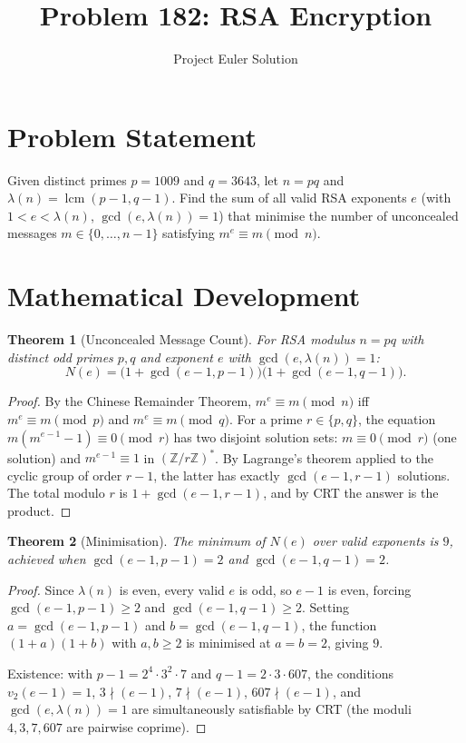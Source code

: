 \documentclass[12pt]{article}
\title{Problem 182: RSA Encryption}
\author{Project Euler Solution}
\date{}
\newtheorem{theorem}{Theorem}
\begin{document}
\maketitle

\section{Problem Statement}

Given distinct primes $p = 1009$ and $q = 3643$, let $n = pq$ and $\lambda(n) = \operatorname{lcm}(p-1, q-1)$. Find the sum of all valid RSA exponents $e$ (with $1 < e < \lambda(n)$, $\gcd(e, \lambda(n)) = 1$) that minimise the number of unconcealed messages $m \in \{0, \ldots, n-1\}$ satisfying $m^e \equiv m \pmod{n}$.

\section{Mathematical Development}

\begin{theorem}[Unconcealed Message Count]
For RSA modulus $n = pq$ with distinct odd primes $p, q$ and exponent $e$ with $\gcd(e, \lambda(n)) = 1$:
\[
N(e) = \bigl(1 + \gcd(e-1, p-1)\bigr)\bigl(1 + \gcd(e-1, q-1)\bigr).
\]
\end{theorem}

\begin{proof}
By the Chinese Remainder Theorem, $m^e \equiv m \pmod{n}$ iff $m^e \equiv m \pmod{p}$ and $m^e \equiv m \pmod{q}$. For a prime $r \in \{p, q\}$, the equation $m(m^{e-1} - 1) \equiv 0 \pmod{r}$ has two disjoint solution sets: $m \equiv 0 \pmod{r}$ (one solution) and $m^{e-1} \equiv 1$ in $(\mathbb{Z}/r\mathbb{Z})^*$. By Lagrange's theorem applied to the cyclic group of order $r - 1$, the latter has exactly $\gcd(e-1, r-1)$ solutions. The total modulo $r$ is $1 + \gcd(e-1, r-1)$, and by CRT the answer is the product.
\end{proof}

\begin{theorem}[Minimisation]
The minimum of $N(e)$ over valid exponents is $9$, achieved when $\gcd(e-1, p-1) = 2$ and $\gcd(e-1, q-1) = 2$.
\end{theorem}

\begin{proof}
Since $\lambda(n)$ is even, every valid $e$ is odd, so $e - 1$ is even, forcing $\gcd(e-1, p-1) \ge 2$ and $\gcd(e-1, q-1) \ge 2$. Setting $a = \gcd(e-1, p-1)$ and $b = \gcd(e-1, q-1)$, the function $(1+a)(1+b)$ with $a, b \ge 2$ is minimised at $a = b = 2$, giving $9$.

Existence: with $p-1 = 2^4 \cdot 3^2 \cdot 7$ and $q-1 = 2 \cdot 3 \cdot 607$, the conditions $v_2(e-1) = 1$, $3 \nmid (e-1)$, $7 \nmid (e-1)$, $607 \nmid (e-1)$, and $\gcd(e, \lambda(n)) = 1$ are simultaneously satisfiable by CRT (the moduli $4, 3, 7, 607$ are pairwise coprime).
\end{proof}
\end{document}
